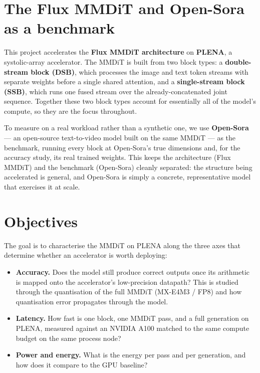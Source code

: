 \documentclass[11pt]{report}
\begin{document}
\section{The Flux MMDiT and Open-Sora as a benchmark}
\label{sec:flux-opensora}

This project accelerates the \textbf{Flux MMDiT architecture} on
\textbf{PLENA}, a systolic-array accelerator. The MMDiT is built from two
block types: a \textbf{double-stream block (DSB)}, which processes the
image and text token streams with separate weights before a single shared
attention, and a \textbf{single-stream block (SSB)}, which runs one fused
stream over the already-concatenated joint sequence. Together these two
block types account for essentially all of the model's compute, so they
are the focus throughout.

To measure on a real workload rather than a synthetic one, we use
\textbf{Open-Sora} --- an open-source text-to-video model built on the
same MMDiT --- as the benchmark, running every block at Open-Sora's true
dimensions and, for the accuracy study, its real trained weights. This
keeps the architecture (Flux MMDiT) and the benchmark (Open-Sora) cleanly
separated: the structure being accelerated is general, and Open-Sora is
simply a concrete, representative model that exercises it at scale.

\section{Objectives}
\label{sec:objectives}

The goal is to characterise the MMDiT on PLENA along the three axes that
determine whether an accelerator is worth deploying:

\begin{itemize}
\item \textbf{Accuracy.} Does the model still produce correct outputs once
its arithmetic is mapped onto the accelerator's low-precision datapath?
This is studied through the quantisation of the full MMDiT (MX-E4M3 / FP8)
and how quantisation error propagates through the model.
\item \textbf{Latency.} How fast is one block, one MMDiT pass, and a full
generation on PLENA, measured against an NVIDIA A100 matched to the same
compute budget on the same process node?
\item \textbf{Power and energy.} What is the energy per pass and per
generation, and how does it compare to the GPU baseline?
\end{itemize}
\end{document}
